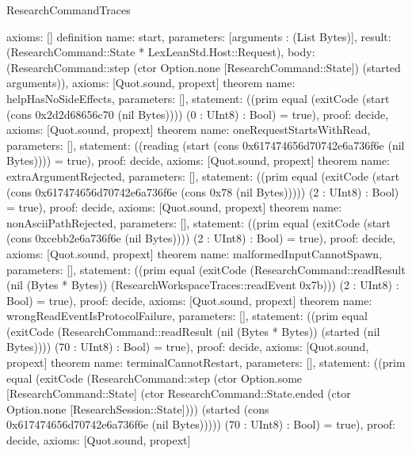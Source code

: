 \begin{lexlean}{ResearchCommandTraces}
\begin{semanticmodule}
{ axioms: []
}
definition{
 name: start,
 parameters: [arguments : (List Bytes)],
 result: (ResearchCommand::State * LexLeanStd.Host::Request),
 body: (ResearchCommand::step (ctor Option.none [ResearchCommand::State]) (started arguments)),
 axioms: [Quot.sound, propext]
}
theorem{
 name: helpHasNoSideEffects,
 parameters: [],
 statement: ((prim equal (exitCode (start (cons 0x2d2d68656c70 (nil Bytes)))) (0 : UInt8) : Bool) = true),
 proof: decide{},
 axioms: [Quot.sound, propext]
}
theorem{
 name: oneRequestStartsWithRead,
 parameters: [],
 statement: ((reading (start (cons 0x617474656d70742e6a736f6e (nil Bytes)))) = true),
 proof: decide{},
 axioms: [Quot.sound, propext]
}
theorem{
 name: extraArgumentRejected,
 parameters: [],
 statement: ((prim equal (exitCode (start (cons 0x617474656d70742e6a736f6e (cons 0x78 (nil Bytes))))) (2 : UInt8) : Bool) = true),
 proof: decide{},
 axioms: [Quot.sound, propext]
}
theorem{
 name: nonAsciiPathRejected,
 parameters: [],
 statement: ((prim equal (exitCode (start (cons 0xcebb2e6a736f6e (nil Bytes)))) (2 : UInt8) : Bool) = true),
 proof: decide{},
 axioms: [Quot.sound, propext]
}
theorem{
 name: malformedInputCannotSpawn,
 parameters: [],
 statement: ((prim equal (exitCode (ResearchCommand::readResult (nil (Bytes * Bytes)) (ResearchWorkspaceTraces::readEvent 0x7b))) (2 : UInt8) : Bool) = true),
 proof: decide{},
 axioms: [Quot.sound, propext]
}
theorem{
 name: wrongReadEventIsProtocolFailure,
 parameters: [],
 statement: ((prim equal (exitCode (ResearchCommand::readResult (nil (Bytes * Bytes)) (started (nil Bytes)))) (70 : UInt8) : Bool) = true),
 proof: decide{},
 axioms: [Quot.sound, propext]
}
theorem{
 name: terminalCannotRestart,
 parameters: [],
 statement: ((prim equal (exitCode (ResearchCommand::step (ctor Option.some [ResearchCommand::State] (ctor ResearchCommand::State.ended (ctor Option.none [ResearchSession::State]))) (started (cons 0x617474656d70742e6a736f6e (nil Bytes))))) (70 : UInt8) : Bool) = true),
 proof: decide{},
 axioms: [Quot.sound, propext]
}
\end{semanticmodule}
\end{lexlean}
